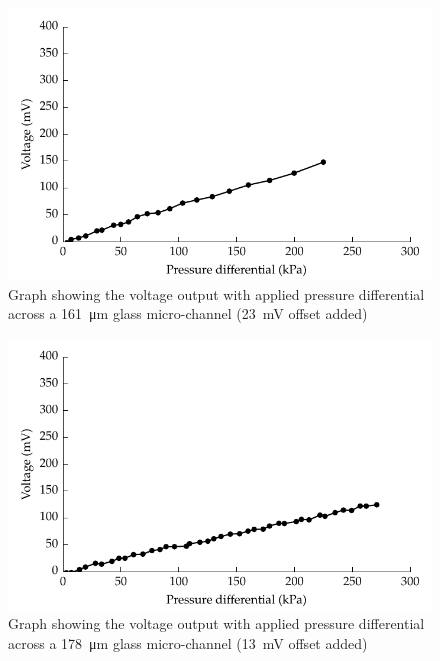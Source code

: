 \begin{figure}
    \centering
    \includegraphics{content/pt1/01-PowerHarvesting/graphics/streamingCell_voltVsPress_161um_out}
    \caption{\label{fig:VvsP_161um}Graph showing the voltage output with applied pressure differential across a \SI{161}{\micro\metre} glass micro-channel (\SI{23}{\milli\volt} offset added)}
\end{figure}

\begin{figure}
    \centering
    \includegraphics{content/pt1/01-PowerHarvesting/graphics/streamingCell_voltVsPress_178um_out}
    \caption{\label{fig:VvsP_178um}Graph showing the voltage output with applied pressure differential across a \SI{178}{\micro\metre} glass micro-channel (\SI{13}{\milli\volt} offset added)}
\end{figure}

